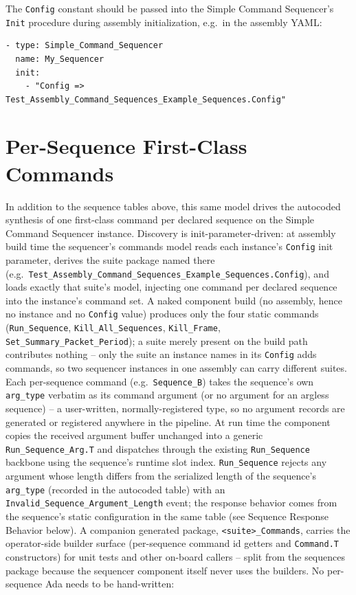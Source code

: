 The \texttt{Config} constant should be passed into the Simple Command Sequencer's \texttt{Init} procedure during assembly initialization, e.g.\ in the assembly YAML:

\begin{verbatim}
- type: Simple_Command_Sequencer
  name: My_Sequencer
  init:
    - "Config => Test_Assembly_Command_Sequences_Example_Sequences.Config"
\end{verbatim}



\section{Per-Sequence First-Class Commands}

In addition to the sequence tables above, this same model drives the autocoded synthesis of one first-class command per declared sequence on the Simple Command Sequencer instance. Discovery is init-parameter-driven: at assembly build time the sequencer's commands model reads each instance's \texttt{Config} init parameter, derives the suite package named there (e.g.\ \texttt{Test\_Assembly\_Command\_Sequences\_Example\_Sequences.Config}), and loads exactly that suite's model, injecting one command per declared sequence into the instance's command set. A naked component build (no assembly, hence no instance and no \texttt{Config} value) produces only the four static commands (\texttt{Run\_Sequence}, \texttt{Kill\_All\_Sequences}, \texttt{Kill\_Frame}, \texttt{Set\_Summary\_Packet\_Period}); a suite merely present on the build path contributes nothing -- only the suite an instance names in its \texttt{Config} adds commands, so two sequencer instances in one assembly can carry different suites. Each per-sequence command (e.g.\ \texttt{Sequence\_B}) takes the sequence's own \texttt{arg\_type} verbatim as its command argument (or no argument for an argless sequence) -- a user-written, normally-registered type, so no argument records are generated or registered anywhere in the pipeline. At run time the component copies the received argument buffer unchanged into a generic \texttt{Run\_Sequence\_Arg.T} and dispatches through the existing \texttt{Run\_Sequence} backbone using the sequence's runtime slot index. \texttt{Run\_Sequence} rejects any argument whose length differs from the serialized length of the sequence's \texttt{arg\_type} (recorded in the autocoded table) with an \texttt{Invalid\_Sequence\_Argument\_Length} event; the response behavior comes from the sequence's static configuration in the same table (see Sequence Response Behavior below). A companion generated package, \texttt{<suite>\_Commands}, carries the operator-side builder surface (per-sequence command id getters and \texttt{Command.T} constructors) for unit tests and other on-board callers -- split from the sequences package because the sequencer component itself never uses the builders. No per-sequence Ada needs to be hand-written:

